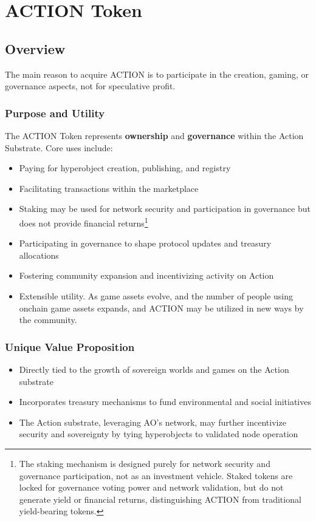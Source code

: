 \section{ACTION Token}

\subsection{Overview}

The main reason to acquire ACTION is to participate in the creation, gaming, or governance aspects, not for speculative profit.

\subsubsection{Purpose and Utility}
The ACTION Token represents \textbf{ownership} and \textbf{governance} within the Action Substrate. Core uses include:

\begin{itemize}
\item Paying for hyperobject creation, publishing, and registry
\item Facilitating transactions within the marketplace
\item Staking may be used for network security and participation in governance but does not provide financial returns\footnote{The staking mechanism is designed purely for network security and governance participation, not as an investment vehicle. Staked tokens are locked for governance voting power and network validation, but do not generate yield or financial returns, distinguishing ACTION from traditional yield-bearing tokens.}
\item Participating in governance to shape protocol updates and treasury allocations
\item Fostering community expansion and incentivizing activity on Action
\item Extensible utility. As game assets evolve, and the number of people using onchain game assets expands, and ACTION may be utilized in new ways by the community.
\end{itemize}

\subsubsection{Unique Value Proposition}
\begin{itemize}
\item Directly tied to the growth of sovereign worlds and games on the Action substrate
\item Incorporates treasury mechanisms to fund environmental and social initiatives
\item The Action substrate, leveraging AO's network, may further incentivize security and sovereignty by tying hyperobjects to validated node operation
\end{itemize}

